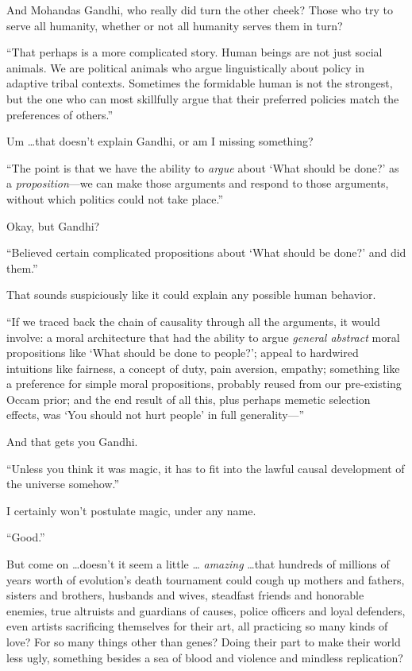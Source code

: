 {
 And Mohandas Gandhi, who really did turn the other cheek? Those
who try to serve all humanity, whether or not all humanity serves them
in turn?}

{
 ``That perhaps is a more complicated story. Human
beings are not just social animals. We are political animals who argue
linguistically about policy in adaptive tribal contexts. Sometimes the
formidable human is not the strongest, but the one who can most
skillfully argue that their preferred policies match the preferences of
others.''}

{
 Um \ldots that doesn't explain Gandhi, or am I
missing something?}

{
 ``The point is that we have the ability to
\textit{argue} about `What should be
done?' as a \textit{proposition}{}---we can make those
arguments and respond to those arguments, without which politics could
not take place.''}

{
 Okay, but Gandhi?}

{
 ``Believed certain complicated propositions about
`What should be done?' and did
them.''}

{
 That sounds suspiciously like it could explain any possible human
behavior.}

{
 ``If we traced back the chain of causality
through all the arguments, it would involve: a moral architecture that
had the ability to argue \textit{general abstract} moral propositions
like `What should be done to people?';
appeal to hardwired intuitions like fairness, a concept of duty, pain
aversion, empathy; something like a preference for simple moral
propositions, probably reused from our pre-existing Occam prior; and
the end result of all this, plus perhaps memetic selection effects, was
`You should not hurt people' in full
generality---''}

{
 And that gets you Gandhi.}

{
 ``Unless you think it was magic, it has to fit
into the lawful causal development of the universe
somehow.''}

{
 I certainly won't postulate magic, under any
name.}

{
 ``Good.''}

{
 But come on \ldots doesn't it seem a little \ldots
\textit{amazing} \ldots that hundreds of millions of years worth of
evolution's death tournament could cough up mothers and
fathers, sisters and brothers, husbands and wives, steadfast friends
and honorable enemies, true altruists and guardians of causes, police
officers and loyal defenders, even artists sacrificing themselves for
their art, all practicing so many kinds of love? For so many things
other than genes? Doing their part to make their world less ugly,
something besides a sea of blood and violence and mindless
replication?}

